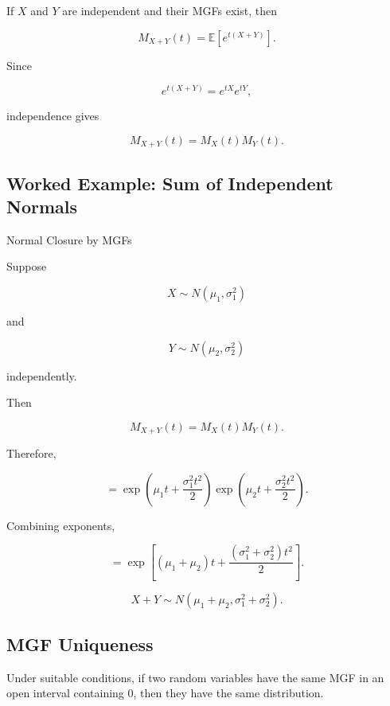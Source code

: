 If \(X\) and \(Y\) are independent and their MGFs exist, then

\[
M_{X+Y}(t)
=
\mathbb{E}[e^{t(X+Y)}].
\]

Since

\[
e^{t(X+Y)}
=
e^{tX}e^{tY},
\]

independence gives

\[
\boxed{
M_{X+Y}(t)
=
M_X(t)M_Y(t).
}
\]

\subsection{Worked Example: Sum of Independent Normals}
\label{subsec:worked-mgf-normal-sum}

\begin{workedexamplebox}{Normal Closure by MGFs}

Suppose

\[
X\sim N(\mu_1,\sigma_1^2)
\]

and

\[
Y\sim N(\mu_2,\sigma_2^2)
\]

independently.

Then

\[
M_{X+Y}(t)
=
M_X(t)M_Y(t).
\]

Therefore,

\[
=
\exp
\left(
\mu_1t+\frac{\sigma_1^2t^2}{2}
\right)
\exp
\left(
\mu_2t+\frac{\sigma_2^2t^2}{2}
\right).
\]

Combining exponents,

\[
=
\exp
\left[
(\mu_1+\mu_2)t
+
\frac{
(\sigma_1^2+\sigma_2^2)t^2
}{2}
\right].
\]

\begin{answerbox}
\[
\boxed{
X+Y
\sim
N
\left(
\mu_1+\mu_2,
\sigma_1^2+\sigma_2^2
\right).
}
\]
\end{answerbox}

\end{workedexamplebox}

\subsection{MGF Uniqueness}
\label{subsec:mgf-uniqueness}

Under suitable conditions, if two random variables have the same MGF in
an open interval containing \(0\), then they have the same distribution.

